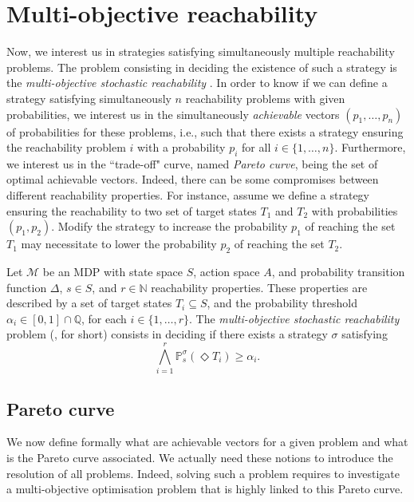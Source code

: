 \section{Multi-objective reachability}
\label{mosr-section}
Now, we interest us in strategies satisfying simultaneously multiple reachability problems.
The problem consisting in deciding the existence of
such a strategy is the \textit{multi-objective stochastic reachability} \cite{DBLP:journals/lmcs/EtessamiKVY08}.
In order to know if we can define a strategy satisfying simultaneously $n$ reachability problems with given probabilities, we interest us in the simultaneously \textit{achievable} vectors $(p_1, \dots, p_n)$ of probabilities for these problems, i.e., such that there exists a strategy ensuring the reachability problem $i$ with a probability $p_i$ for all $i \in \{1, \dots, n\}$.
Furthermore, we interest us in the ``trade-off" curve, named \textit{Pareto curve}, being the set of optimal achievable vectors.
Indeed, there can be some compromises between different reachability properties. For instance,
assume we define a strategy ensuring the reachability to two set of target states $T_1$ and $T_2$ with probabilities $(p_1, p_2)$.
 Modify the strategy to increase the probability $p_1$ of reaching the set $T_1$ may necessitate to lower the probability $p_2$ of reaching the set $T_2$.

\begin{definition}
  Let $\mathcal{M}$ be an MDP with state space $S$, action space $A$, and probability transition function $\Delta$, $s \in S$, and $r \in \mathbb{N}$ reachability properties.
  These properties are described by a set of target states $T_i \subseteq S$, and the probability threshold $\alpha_i \in [0, 1] \cap \mathbb{Q}$, for each $i \in \{1, \dots, r\}$.
  The \textit{multi-objective stochastic reachability} problem (\MOSR{}, for short) consists in deciding if there exists a strategy $\sigma$ satisfying
  \[
    \bigwedge_{i=1}^r \mathbb{P}^\sigma_s(\Diamond T_i) \geq \alpha_i.
  \]
\end{definition}


\subsection{Pareto curve}
We now define formally what are achievable vectors for a given \MOSR{} problem and what is the Pareto curve associated.
We actually need these notions to introduce the resolution of all \MOSR{} problems.
Indeed, solving such a problem requires to investigate a multi-objective optimisation problem that is highly linked to this Pareto curve.\\


